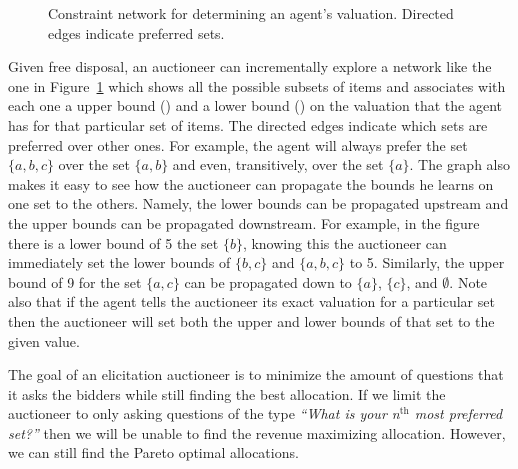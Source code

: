 \begin{figure}
\begin{minipage}{1.0\linewidth}
\begin{center}
  \end{center}
\end{minipage}
\caption{Constraint network for determining an agent's valuation.
  Directed edges indicate preferred sets.}
\label{fig:ca-constraintnet}
\end{figure}

Given free disposal, an auctioneer can incrementally explore a network
like the one in Figure~\ref{fig:ca-constraintnet} which shows all the
possible subsets of items and associates with each one a upper bound
() and a lower bound () on the valuation that the agent has for
that particular set of items. The directed edges indicate which sets
are preferred over other ones. For example, the agent will always
prefer the set $\{a,b,c\}$ over the set $\{a,b\}$ and even,
transitively, over the set $\{a\}$. The graph also makes it easy to
see how the auctioneer can propagate the bounds he learns on one set to
the others.  Namely, the lower bounds can be propagated upstream and
the upper bounds can be propagated downstream. For example, in the
figure there is a lower bound of 5 the set $\{b\}$, knowing this the
auctioneer can immediately set the lower bounds of $\{b,c\}$ and
$\{a,b,c\}$ to 5.  Similarly, the upper bound of 9 for the set
$\{a,c\}$ can be propagated down to $\{a\}$, $\{c\}$, and $\emptyset$.
Note also that if the agent tells the auctioneer its exact valuation
for a particular set then the auctioneer will set both the upper and
lower bounds of that set to the given value.

The goal of an elicitation auctioneer is to minimize the amount of
questions that it asks the bidders while still finding the best
allocation. If we limit the auctioneer to only asking questions of the
type \textit{``What is your n$^\text{th}$ most preferred set?''} then
we will be unable to find the revenue maximizing allocation. However,
we can still find the Pareto optimal allocations.

